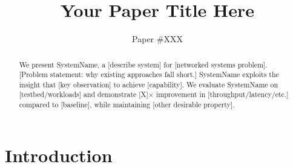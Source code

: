 \documentclass[letterpaper,twocolumn,10pt]{article}
\newcommand{\system}{SystemName\xspace}
\begin{document}
\title{Your Paper Title Here}

\author{Paper \#XXX}  %

\maketitle

\begin{abstract}
%

We present \system, a [describe system] for [networked systems problem].
[Problem statement: why existing approaches fall short.]
\system exploits the insight that [key observation] to achieve [capability].
We evaluate \system on [testbed/workloads] and demonstrate [X]$\times$
improvement in [throughput/latency/etc.] compared to [baseline],
while maintaining [other desirable property].
\end{abstract}

\section{Introduction}
\label{sec:intro}

%
\end{document}
